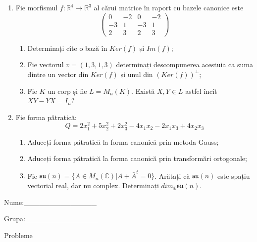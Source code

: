 \documentclass{article}
\begin{document}
\begin{enumerate}
 \item Fie morfismul $f:\mathbb{R}^4 \to \mathbb{R}^3$ al cărui matrice în raport cu bazele canonice este
$$\begin{pmatrix}
0&-2&0&-2\\
-3&1&-3&1\\
2&3&2&3
\end{pmatrix}$$

\begin{enumerate}
\item Determinați cîte o bază în $Ker(f)$ și $Im(f)$;
\item Fie vectorul $v=(1,3,1,3)$ determinați descompunerea acestuia ca suma dintre un vector din $Ker(f)$ și unul din $(Ker(f))^\perp$;
\item Fie $K$ un corp și fie $L=M_n(K)$. Există $X,Y \in L$ astfel încît $XY-YX=I_n$?  
\end{enumerate}
\item Fie forma pătratică:
$$Q= 2x_1^2+5x_2^2+2x_3^2-4x_1x_2-2x_1x_3+4x_2x_3$$

\begin{enumerate}
\item Aduceți forma pătratică la forma canonică prin metoda Gauss;
\item Aduceți forma pătratică la forma canonică prin transformări ortogonale;
\item Fie $\mathfrak{su}(n)=\{ A \in M_n(\mathbb{C}) | A+\bar{A}^t=0\}$. Arătați că $\mathfrak{su}(n)$ este spațiu vectorial real, dar nu complex.
Determinați $dim_{\mathbb{R}}\mathfrak{su}(n)$.
\end{enumerate}
\end{enumerate}
\newpage
\begin{flushright}
Nume:\_\_\_\_\_\_\_\_\_\_\_\_\_\_
 
 
Grupa:\_\_\_\_\_\_\_\_\_\_\_\_\_\_
\end{flushright}
\begin{center}
\vspace{2cm}
{\Large Probleme}
\vspace{2cm}
\end{center}
\end{document}
